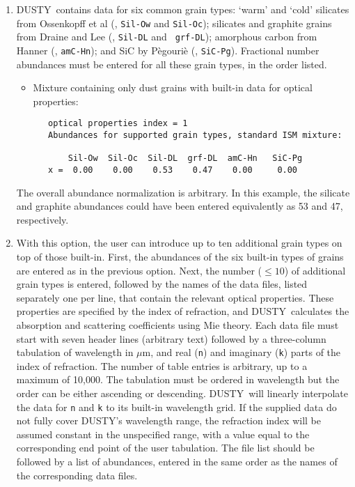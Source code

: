 \documentclass[12pt]{article} \usepackage{epsf}
\def\D  {{\sf DUSTY}}
\def\mic    {\hbox{$\mu$m}}
\begin{document}
\begin{enumerate}

\item \D\ contains data for six common grain types: `warm' and `cold' silicates
from Ossenkopff et al (\cite{Oss92}, {\tt Sil-Ow} and {\tt Sil-Oc}); silicates
and graphite grains from Draine and Lee (\cite{DL84}, {\tt Sil-DL} and {\tt
grf-DL}); amorphous carbon from Hanner (\cite{Hann88}, {\tt amC-Hn}); and SiC
by P\`egouri\`e (\cite{Peg88}, {\tt SiC-Pg}).  Fractional number abundances
must be entered for all these grain types, in the order listed.

\begin{itemize}
\item Mixture containing only dust grains with built-in data for optical
properties:

\begin{verbatim}
   optical properties index = 1
   Abundances for supported grain types, standard ISM mixture:

       Sil-Ow  Sil-Oc  Sil-DL  grf-DL  amC-Hn   SiC-Pg
   x =  0.00    0.00    0.53    0.47    0.00     0.00
 \end{verbatim}
\end{itemize}
The overall abundance normalization is arbitrary.  In this example, the
silicate and graphite abundances could have been entered equivalently as 53 and
47, respectively.

\item With this option, the user can introduce up to ten additional grain types
on top of those built-in.  First, the abundances of the six built-in types of
grains are entered as in the previous option. Next, the number ($\le 10$) of
additional grain types is entered, followed by the names of the data files,
listed separately one per line, that contain the relevant optical properties.
These properties are specified by the index of refraction, and \D\ calculates
the absorption and scattering coefficients using Mie theory.  Each data file
must start with seven header lines (arbitrary text) followed by a three-column
tabulation of wavelength in \mic, and real ({\tt n}) and imaginary ({\tt k})
parts of the index of refraction. The number of table entries is arbitrary, up
to a maximum of 10,000. The tabulation must be ordered in wavelength but the
order can be either ascending or descending. \D\ will linearly interpolate the
data for {\tt n} and {\tt k} to its built-in wavelength grid.  If the supplied
data do not fully cover \D's wavelength range, the refraction index will be
assumed constant in the unspecified range, with a value equal to the
corresponding end point of the user tabulation. The file list should be
followed by a list of abundances, entered in the same order as the names of the
corresponding data files.


\end{enumerate}
\end{document}
